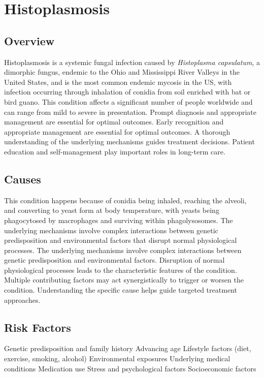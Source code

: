 \chapter{Histoplasmosis}
\label{sec:Histoplasmosis}

\section{Overview}
Histoplasmosis is a systemic fungal infection caused by \textit{Histoplasma capsulatum}, a dimorphic fungus, endemic to the Ohio and Mississippi River Valleys in the United States, and is the most common endemic mycosis in the US, with infection occurring through inhalation of conidia from soil enriched with bat or bird guano. This condition affects a significant number of people worldwide and can range from mild to severe in presentation. Prompt diagnosis and appropriate management are essential for optimal outcomes. Early recognition and appropriate management are essential for optimal outcomes. A thorough understanding of the underlying mechanisms guides treatment decisions. Patient education and self-management play important roles in long-term care.
\section{Causes}
This condition happens because of conidia being inhaled, reaching the alveoli, and converting to yeast form at body temperature, with yeasts being phagocytosed by macrophages and surviving within phagolysosomes. The underlying mechanisms involve complex interactions between genetic predisposition and environmental factors that disrupt normal physiological processes. The underlying mechanisms involve complex interactions between genetic predisposition and environmental factors. Disruption of normal physiological processes leads to the characteristic features of the condition. Multiple contributing factors may act synergistically to trigger or worsen the condition. Understanding the specific cause helps guide targeted treatment approaches.
\section{Risk Factors}
Genetic predisposition and family history Advancing age Lifestyle factors (diet, exercise, smoking, alcohol) Environmental exposures Underlying medical conditions Medication use Stress and psychological factors Socioeconomic factors

